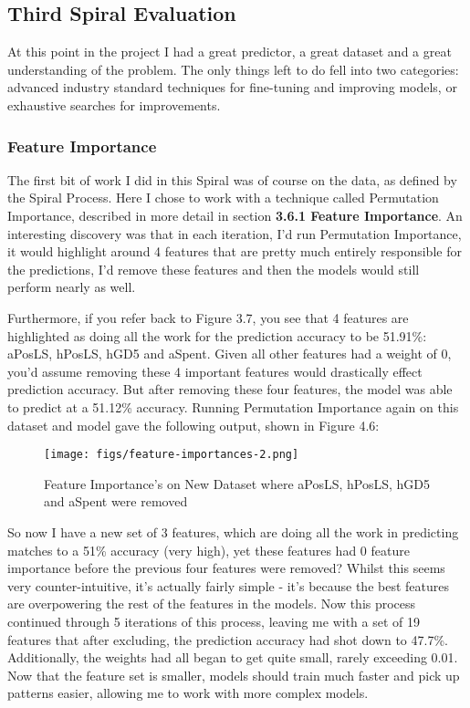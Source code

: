 \documentclass[12pt,a4paper,twoside,openright]{report}
\begin{document}
\subsection{Third Spiral Evaluation}

At this point in the project I had a great predictor, a great dataset and a great understanding of the problem. The only things left to do fell into two categories: advanced industry standard techniques for fine-tuning and improving models, or exhaustive searches for improvements.

\subsubsection{Feature Importance}

The first bit of work I did in this Spiral was of course on the data, as defined by the Spiral Process. Here I chose to work with a technique called Permutation Importance, described in more detail in section \textbf{3.6.1 Feature Importance}. An interesting discovery was that in each iteration, I'd run Permutation Importance, it would highlight around 4 features that are pretty much entirely responsible for the predictions, I'd remove these features and then the models would still perform nearly as well.

Furthermore, if you refer back to Figure 3.7, you see that 4 features are highlighted as doing all the work for the prediction accuracy to be 51.91\%: aPosLS, hPosLS, hGD5 and aSpent. Given all other features had a weight of 0, you'd assume removing these 4 important features would drastically effect prediction accuracy. But after removing these four features, the model was able to predict at a 51.12\% accuracy. Running Permutation Importance again on this dataset and model gave the following output, shown in Figure 4.6:

\begin{figure}[h]
  \centering
  \texttt{[image: figs/feature-importances-2.png]}
  \caption{Feature Importance's on New Dataset where aPosLS, hPosLS, hGD5 and aSpent were removed}
  \label{fig:feature-importances-2}
\end{figure}

So now I have a new set of 3 features, which are doing all the work in predicting matches to a 51\% accuracy (very high), yet these features had 0 feature importance before the previous four features were removed? Whilst this seems very counter-intuitive, it's actually fairly simple - it's because the best features are overpowering the rest of the features in the models. Now this process continued through 5 iterations of this process, leaving me with a set of 19 features that after excluding, the prediction accuracy had shot down to 47.7\%. Additionally, the weights had all began to get quite small, rarely exceeding 0.01. Now that the feature set is smaller, models should train much faster and pick up patterns easier, allowing me to work with more complex models.
\end{document}
